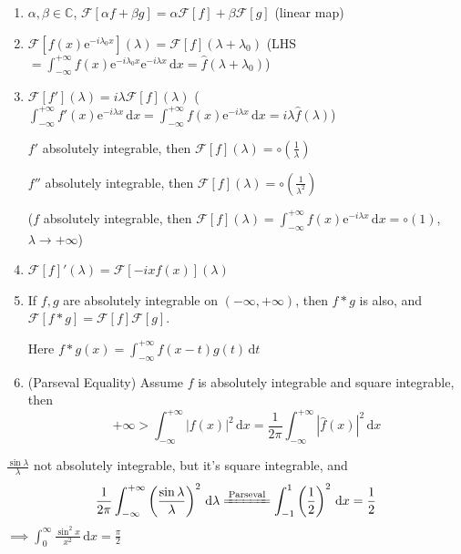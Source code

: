 \begin{enumerate}
    \item $\alpha,\beta\in\mathbb{C}$, $\mathcal{F}[\alpha f+\beta g]=\alpha\mathcal{F}[f]+\beta\mathcal{F}[g]$ (linear map)
    \item $\mathcal{F}\left[f(x)\mathrm{e}^{-i\lambda_0 x}\right](\lambda)=\mathcal{F}[f](\lambda+\lambda_0)$ (LHS$=\int_{-\infty}^{+\infty}f(x)\mathrm{e}^{-i\lambda_0 x}\mathrm{e}^{-i\lambda x}\,\mathrm{d}x=\hat{f}(\lambda+\lambda_0)$)
    \item $\mathcal{F}[f'](\lambda)=i\lambda\mathcal{F}[f](\lambda)$ ($\int_{-\infty}^{+\infty}f'(x)\mathrm{e}^{-i\lambda x}\,\mathrm{d}x=\int_{-\infty}^{+\infty}f(x)\mathrm{e}^{-i\lambda x}\,\mathrm{d}x=i\lambda\hat{f}(\lambda)$)

          \begin{example}
              $f'$ absolutely integrable, then $\mathcal{F}[f](\lambda)=\circ\left(\frac{1}{\lambda}\right)$

              $f''$ absolutely integrable, then $\mathcal{F}[f](\lambda)=\circ\left(\frac{1}{\lambda^2}\right)$

              ($f$ absolutely integrable, then $\mathcal{F}[f](\lambda)=\int_{-\infty}^{+\infty}f(x)\mathrm{e}^{-i\lambda x}\,\mathrm{d}x=\circ(1)$, $\lambda\to+\infty$)
          \end{example}

    \item $\mathcal{F}[f]'(\lambda)=\mathcal{F}[-ixf(x)](\lambda)$
    \item If $f,g$ are absolutely integrable on $(-\infty,+\infty)$, then $f*g$ is also, and $\mathcal{F}[f*g]=\mathcal{F}[f]\mathcal{F}[g]$.

          Here $f*g(x)=\int_{-\infty}^{+\infty}f(x-t)g(t)\,\mathrm{d}t$

    \item (Parseval Equality) Assume $f$ is absolutely integrable and square integrable, then
          $$+\infty>\int_{-\infty}^{+\infty}\left|f(x)\right|^2\,\mathrm{d}x=\frac{1}{2\pi}\int_{-\infty}^{+\infty}\left|\hat{f}(x)\right|^2\,\mathrm{d}x$$
\end{enumerate}

\begin{example}
    $\frac{\sin\lambda}{\lambda}$ not absolutely integrable, but it's square integrable, and
    $$\frac{1}{2\pi}\int_{-\infty}^{+\infty}\left(\frac{\sin\lambda}{\lambda}\right)^2\,\mathrm{d}\lambda\xlongequal{\text{Parseval}}\int_{-1}^1\left(\frac{1}{2}\right)^2\,\mathrm{d}x=\frac{1}{2}$$
    $\implies\int_0^{\infty}\frac{\sin^2x}{x^2}\,\mathrm{d}x=\frac{\pi}{2}$
\end{example}

